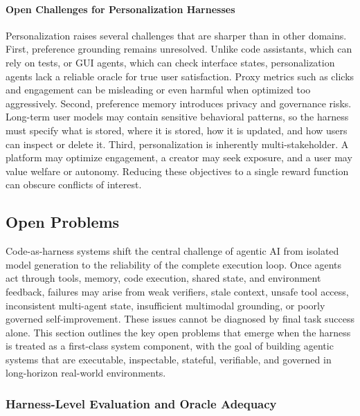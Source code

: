 \documentclass{llmxive}
\begin{document}
\paragraph{Open Challenges for Personalization Harnesses}
Personalization raises several challenges that are sharper than in other domains. First, preference grounding remains unresolved. Unlike code assistants, which can rely on tests, or GUI agents, which can check interface states, personalization agents lack a reliable oracle for true user satisfaction. Proxy metrics such as clicks and engagement can be misleading or even harmful when optimized too aggressively.
Second, preference memory introduces privacy and governance risks. Long-term user models may contain sensitive behavioral patterns, so the harness must specify what is stored, where it is stored, how it is updated, and how users can inspect or delete it. Third, personalization is inherently multi-stakeholder. A platform may optimize engagement, a creator may seek exposure, and a user may value welfare or autonomy. Reducing these objectives to a single reward function can obscure conflicts of interest.



\subsection{Open Problems}

Code-as-harness systems shift the central challenge of agentic AI from isolated model generation to the reliability of the complete execution loop. Once agents act through tools, memory, code execution, shared state, and environment feedback, failures may arise from weak verifiers, stale context, unsafe tool access, inconsistent multi-agent state, insufficient multimodal grounding, or poorly governed self-improvement. These issues cannot be diagnosed by final task success alone. This section outlines the key open problems that emerge when the harness is treated as a first-class system component, with the goal of building agentic systems that are executable, inspectable, stateful, verifiable, and governed in long-horizon real-world environments.

\subsubsection{Harness-Level Evaluation and Oracle Adequacy}
\end{document}
